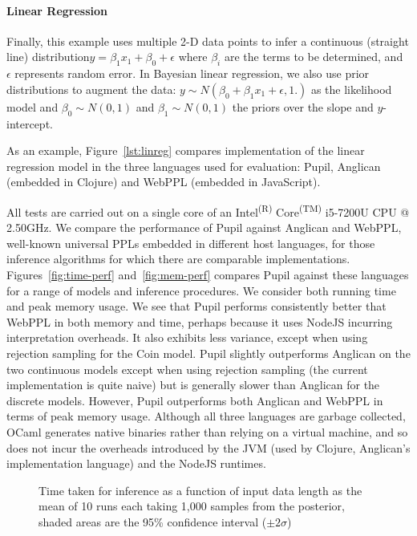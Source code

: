 \documentclass[sigconf]{acmart}
\newcommand{\pupil}{Pupil\xspace}
\begin{document}
\paragraph{Linear Regression}
Finally, this example uses multiple 2-D data points to infer a continuous (straight line) distribution$ y=\beta_1 x_1 + \beta_0 + \epsilon$ where  $\beta_i$ are the terms to be determined, and $\epsilon$ represents random error. In Bayesian linear regression, we also use prior distributions to augment the data:   $y \sim N(\beta_0 + \beta_1 x_1 + \epsilon, 1.)$ as the likelihood model and $\beta_0 \sim N(0,1)$ and $\beta_1 \sim N(0,1)$ the priors over the slope and $y$-intercept.

As an example, Figure~\ref{lst:linreg} compares implementation of the linear regression model in the three languages used for evaluation: \pupil, Anglican (embedded in Clojure) and WebPPL (embedded in JavaScript).

All tests are carried out on a single core of an Intel\textsuperscript{(R)} Core\textsuperscript{(TM)} i5-7200U CPU @ 2.50GHz. We compare the performance of \pupil against Anglican and WebPPL, well-known universal PPLs embedded in different host languages, for those inference algorithms for which there are comparable implementations. Figures~\ref{fig:time-perf} and~\ref{fig:mem-perf} compares \pupil against these languages for a range of models and inference procedures. We consider both running time and peak memory usage. We see that \pupil performs consistently better that WebPPL in both memory and time, perhaps because it uses NodeJS incurring interpretation overheads. It also exhibits less variance, except when using rejection sampling for the Coin model. \pupil slightly outperforms Anglican on the two continuous models except when using rejection sampling (the current implementation is quite naive) but is generally slower than Anglican for the discrete models. However, \pupil outperforms both Anglican and WebPPL in terms of peak memory usage. Although all three languages are garbage collected, OCaml generates native binaries rather than relying on a virtual machine, and so does not incur the overheads introduced by the JVM (used by Clojure, Anglican's implementation language) and the NodeJS runtimes.

\begin{figure}
  \centering
  
  \caption{\label{fig:time-datasize}
    Time taken for inference as a function of input data length as the mean of 10 runs each taking 1,000 samples from the posterior, shaded areas are the 95\% confidence interval ($\pm 2\sigma$)}
\end{figure}
\end{document}
